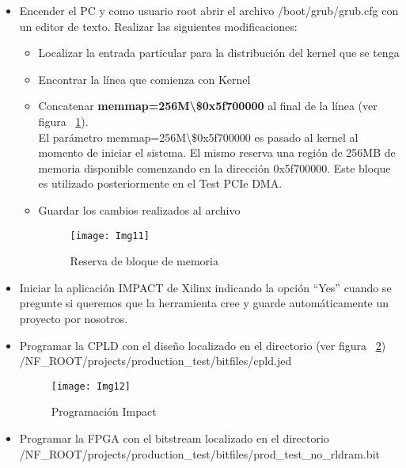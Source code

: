 \begin{itemize}
\item Encender el PC y como usuario root abrir el archivo /boot/grub/grub.cfg con un editor de texto. Realizar las siguientes modificaciones:

\begin{itemize}
\item Localizar la entrada particular para la distribución del kernel que se tenga
\item Encontrar la línea que comienza con Kernel
\item Concatenar \textbf{memmap=256M\textbackslash\$0x5f700000} al final de la línea (ver figura ~\ref{fig:Img11}).\\
El parámetro memmap=256M\textbackslash\$0x5f700000 es pasado al kernel al momento de iniciar el sistema. El mismo reserva una región de 256MB de memoria disponible comenzando en la dirección 0x5f700000. Este bloque es utilizado posteriormente en el Test PCIe DMA.
\item Guardar los cambios realizados al archivo

\newpage
\begin{figure}[htbp!] 
\centering    
\texttt{[image: Img11]}
\caption[Reserva de bloque de memoria]{Reserva de bloque de memoria}
\label{fig:Img11}
\end{figure}

\end{itemize}

\item Iniciar la aplicación IMPACT de Xilinx indicando la opción “Yes” cuando se pregunte si queremos que la herramienta cree y guarde automáticamente un proyecto por nosotros.

\item Programar la CPLD con el diseño localizado en el directorio (ver figura ~\ref{fig:Img12})\\ 
/NF\_ROOT/projects/production\_test/bitfiles/cpld.jed

\begin{figure}[htbp!] 
\centering    
\texttt{[image: Img12]}
\caption[Programación Impact]{Programación Impact}
\label{fig:Img12}
\end{figure}

\item Programar la FPGA con el bitstream localizado en el directorio\\
/NF\_ROOT/projects/production\_test/bitfiles/prod\_test\_no\_rldram.bit


\end{itemize}
